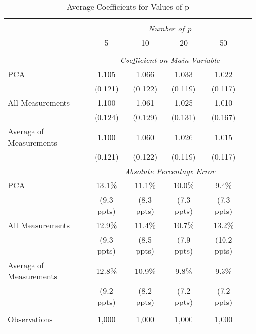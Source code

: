 \begin{table}[!htbp] \centering
  \caption{Average Coefficients for Values of p \label{sim_p_3}}
\begin{tabular}{@{\extracolsep{5pt}}lccccc}
\\[-1.8ex]\hline
\hline \\[-1.8ex]
& \multicolumn{5}{c}{\textit{Number of p}} \
\cr 
\\[-1.8ex] & 5 & 10 & 20 & 50 \\
\hline \\[-1.8ex]
& \multicolumn{5}{c}{\textit{Coefficient on Main Variable}} \\
 PCA & 1.105 & 1.066 & 1.033 & 1.022  \\
  & (0.121) & (0.122) & (0.119) & (0.117)\\
 All Measurements & 1.100 & 1.061 & 1.025 & 1.010  \\
  & (0.124) & (0.129) & (0.131) & (0.167)\\
 Average of Measurements & 1.100 & 1.060 & 1.026 & 1.015  \\
  & (0.121) & (0.122) & (0.119) & (0.117)\\
& \multicolumn{5}{c}{\textit{Absolute Percentage Error}} \\
  PCA & 13.1\% & 11.1\% & 10.0\% & 9.4\%  \\
   & (9.3 ppts) & (8.3 ppts) & (7.3 ppts) & (7.3 ppts)\\
  All Measurements & 12.9\% & 11.4\% & 10.7\% & 13.2\%  \\
  & (9.3 ppts) & (8.5 ppts) & (7.9 ppts) & (10.2 ppts)\\
  Average of Measurements & 12.8\% & 10.9\% & 9.8\% & 9.3\%  \\
  & (9.2 ppts) & (8.2 ppts) & (7.2 ppts) & (7.2 ppts)\\
\hline \\[-1.8ex]
 Observations & 1,000 & 1,000 & 1,000 & 1,000 & \\
\hline
\hline \\[-1.8ex]
\end{tabular}
\end{table}